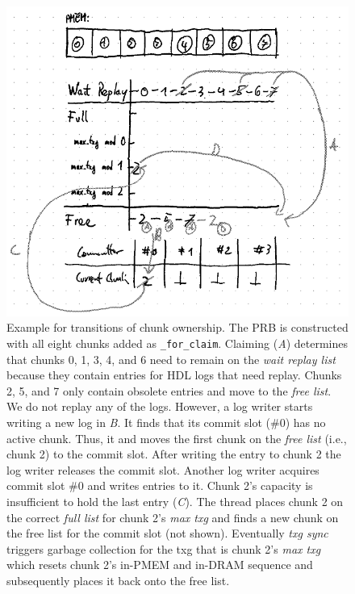 \documentclass[12pt,a4paper,twoside]{book}
\begin{document}
\begin{figure}[H]
    \centering
    \includegraphics{fig/prb_chunk_ownership_cycle__example}
    \caption{
        Example for transitions of chunk ownership.
        The PRB is constructed with all eight chunks added as \lstinline{_for_claim}.
        Claiming (\textit{A}) determines that chunks 0, 1, 3, 4, and 6 need to remain on the \textit{wait replay list} because they contain entries for HDL logs that need replay.
        Chunks 2, 5, and 7 only contain obsolete entries and move to the \textit{free list}.
        We do not replay any of the logs.
        However, a log writer starts writing a new log in \textit{B}.
        It finds that its commit slot (\#0) has no active chunk.
        Thus, it and moves the first chunk on the \textit{free list} (i.e., chunk 2) to the commit slot.
        After writing the entry to chunk 2 the log writer releases the commit slot.
        Another log writer acquires commit slot \#0 and writes entries to it.
        Chunk 2's capacity is insufficient to hold the last entry (\textit{C}).
        The thread places chunk 2 on the correct \textit{full list} for chunk 2's \textit{max txg} and finds a new chunk on the free list for the commit slot (not shown).
        Eventually \textit{txg sync} triggers garbage collection for the txg that is chunk 2's \textit{max txg} which resets chunk 2's in-PMEM and in-DRAM sequence and subsequently places it back onto the free list.
    }
    \label{fig:prb_chunk_ownership_cycle__example}
\end{figure}
\end{document}
